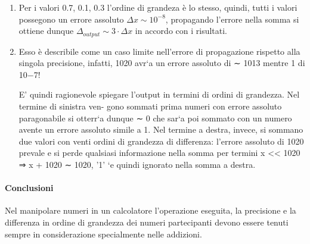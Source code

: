\begin{enumerate}

	\item Per i valori 0.7, 0.1, 0.3 l’ordine di grandeza è lo stesso, quindi,
	      tutti i valori possegono un errore assoluto $\Delta x \sim 10^{-8}$, propagando
	      l’errore nella somma si ottiene dunque $\Delta_{output} \sim 3 \cdot \Delta x$ in accordo con
	      i risultati.

	\item Esso è describile come un caso limite nell’errore di propagazione rispetto
	      alla singola precisione, infatti, 1020 avr`a un errore assoluto di ∼ 1013
	      mentre 1 di 10−7!

	      E’ quindi ragionevole spiegare
	      l’output in termini di ordini di grandezza. Nel termine di sinistra ven-
	      gono sommati prima numeri con errore assoluto paragonabile si otterr`a
	      dunque ∼ 0 che sar`a poi sommato con un numero avente un errore
	      assoluto simile a 1.
	      Nel termine a destra, invece, si sommano due
	      valori con venti ordini di grandezza di differenza: l’errore assoluto di
	      1020 prevale e si perde qualsiasi informazione nella somma per termini
	      x << 1020 ⇒ x + 1020 ∼ 1020, ’1’ `e quindi ignorato nella somma a
	      destra.
\end{enumerate}

\paragraph{Conclusioni}
Nel manipolare numeri in un calcolatore l’operazione eseguita, la precisione e
la differenza in ordine di grandezza dei numeri partecipanti devono essere tenuti
sempre in considerazione specialmente nelle addizioni.

